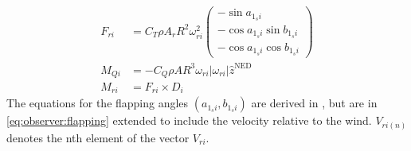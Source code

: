     \begin{subequations}
        \begin{align}
            F_{ri} &= C_{T} \rho A_{r} R^{2} \omega_{ri}^{2}\left(
                \begin{array}{c}
                    -\sin{a_{1_{s}i}} \\
                    -\cos{a_{1_{s}i}}\sin{b_{1_{s}i}} \\
                    -\cos{a_{1_{s}i}}\cos{b_{1_{s}i}}
                \end{array}\right)
                \label{eq:observer:thrust} \\
%
            M_{Qi} &= -C_{Q} \rho A R^{3} \omega_{ri}|\omega_{ri}|\hat{z}^{\text{NED}} \label{eq:observer:torque} \\
%
            M_{ri} &= F_{ri} \times D_{i} \label{eq:observer:thrustmomentum}
        \end{align}
    \end{subequations}
    The equations for the flapping angles $\left(a_{1_{s}i}, b_{1_{s}i}\right)$ are
    derived in \citep{Pounds_modellingand,prouty1995helicopter,leishman2002principles},
    but are in \eqref{eq:observer:flapping} extended to include the velocity relative to the wind.
    $V_{ri(n)}$ denotes the nth element of the vector $V_{ri}$.
